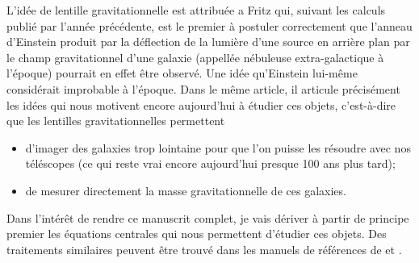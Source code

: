 

L'idée de lentille gravitationnelle est attribuée a Fritz \citet{Zwicky1937} %
qui, suivant les calculs publié par \citet{Einstein1936} l'année précédente, %
est le premier à postuler correctement que l'anneau d'Einstein produit par la déflection 
de la lumière d'une source en arrière plan par le champ gravitationnel d'une galaxie 
(appellée nébuleuse extra-galactique à l'époque) 
pourrait en effet être observé. Une idée qu'Einstein lui-même considérait improbable à l'époque. 
Dans le même article, il articule précisément les idées qui nous motivent encore aujourd'hui 
à étudier ces objets, c'est-à-dire que les lentilles gravitationnelles permettent
\begin{itemize}
        \item d'imager des galaxies trop lointaine pour que l'on puisse les résoudre avec 
                nos téléscopes (ce qui reste vrai encore aujourd'hui presque 100 ans plus tard);
        \item de mesurer directement la masse gravitationnelle de ces galaxies.
\end{itemize}

Dans l'intérêt de rendre ce manuscrit complet, je vais dériver à partir de principe 
premier les équations 
centrales qui nous permettent d'étudier ces objets. Des traitements similaires 
peuvent être trouvé dans les manuels de références de \citet{Meneghetti2013} et 
\citet{Carroll2003}.


